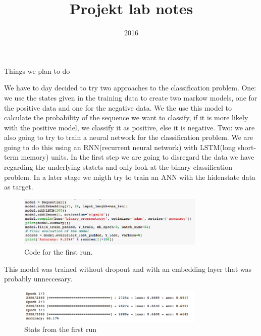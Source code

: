 \documentclass[a4paper]{tufte-handout}
\title{Projekt lab notes}
\date{2016}
\begin{document}
\maketitle


\begin{projects}
	\begin{description}
		\item Things we plan to do 
	\end{description}
\end{projects}


We have to day decided to try two approaches to the classification problem.
One: we use the states given in the training data to create two markow models,
one for the positive data and one for the negative data. We the use this model
to calculate the probability of the sequence we want to classify, if it is more
likely with the positive model, we classify it as positive, else it is
negative. Two: we are also going to try to train a neural network for the
classification problem. We are going to do this using an RNN(recurrent neural
network) with LSTM(long short-term memory) units. In the first step we are
going to disregard the data we have regarding the underlying statets and only
look at the binary classification problem. In a later stage we migth try to
train an ANN with the hidenstate data as target.


\begin{figure}
    \begin{center}
      \includegraphics[width=0.8\textwidth]{pics/code_run_1.png}
    \end{center}
    \caption{Code for the first run.}
\end{figure}

This model was trained without dropout and with an embedding layer that was probably unneccesary.

\begin{figure}
    \begin{center}
      \includegraphics[width=0.8\textwidth]{pics/first_run.png}
    \end{center}
    \caption{Stats from the first run}
\end{figure}



\hrulefill



\end{document}
